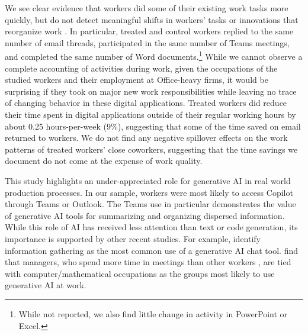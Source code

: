 \documentclass{article}
\begin{document}
We see clear evidence that workers did some of their existing work tasks more quickly, but do not detect meaningful shifts in workers' tasks \citep{autor2024applying} or innovations that reorganize work \citep{brynjolfsson2000beyond}. In particular, treated and control workers replied to the same number of email threads, participated in the same number of Teams meetings, and completed the same number of Word documents.\footnote{While not reported, we also find little change in activity in PowerPoint or Excel.} While we cannot observe a complete accounting of activities during work, given the occupations of the studied workers and their employment at Office-heavy firms, it would be surprising if they took on major new work responsibilities while leaving no trace of changing behavior in these digital applications. Treated workers did reduce their time spent in digital applications outside of their regular working hours by about 0.25 hours-per-week (9\%), suggesting that some of the time saved on email returned to workers. We do not find any negative spillover effects on the work patterns of treated workers' close coworkers, suggesting that the time savings we document do not come at the expense of work quality.

 
This study highlights an under-appreciated role for generative AI in real world production processes. In our sample, workers were most likely to access Copilot through Teams or Outlook. The Teams use in particular demonstrates the value of generative AI tools for summarizing and organizing dispersed information. While this role of AI has received less attention than text or code generation, its importance is supported by other recent studies. For example, \citet{tomlinson2025working} identify information gathering as the most common use of a generative AI chat tool. \citet{blandin2024rapid} find that managers, who spend more time in meetings than other workers \citep{impink2025communication}, are tied with computer/mathematical occupations as the groups most likely to use generative AI at work.
\end{document}
